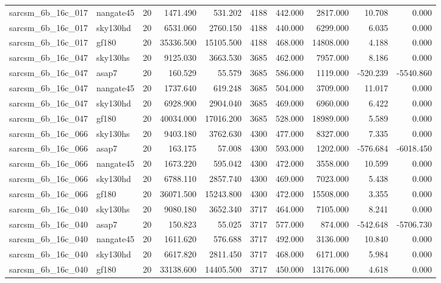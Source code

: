 \begin{tabular}{llrrrrrrrr}
sarcsm\_6b\_16c\_017 & nangate45 & 20 & 1471.490 & 531.202 & 4188 & 442.000 & 2817.000 & 10.708 & 0.000 \\
sarcsm\_6b\_16c\_017 & sky130hd & 20 & 6531.060 & 2760.150 & 4188 & 440.000 & 6299.000 & 6.035 & 0.000 \\
sarcsm\_6b\_16c\_017 & gf180 & 20 & 35336.500 & 15105.500 & 4188 & 468.000 & 14808.000 & 4.188 & 0.000 \\
sarcsm\_6b\_16c\_047 & sky130hs & 20 & 9125.030 & 3663.530 & 3685 & 462.000 & 7957.000 & 8.186 & 0.000 \\
sarcsm\_6b\_16c\_047 & asap7 & 20 & 160.529 & 55.579 & 3685 & 586.000 & 1119.000 & -520.239 & -5540.860 \\
sarcsm\_6b\_16c\_047 & nangate45 & 20 & 1737.640 & 619.248 & 3685 & 504.000 & 3709.000 & 11.017 & 0.000 \\
sarcsm\_6b\_16c\_047 & sky130hd & 20 & 6928.900 & 2904.040 & 3685 & 469.000 & 6960.000 & 6.422 & 0.000 \\
sarcsm\_6b\_16c\_047 & gf180 & 20 & 40034.000 & 17016.200 & 3685 & 528.000 & 18989.000 & 5.589 & 0.000 \\
sarcsm\_6b\_16c\_066 & sky130hs & 20 & 9403.180 & 3762.630 & 4300 & 477.000 & 8327.000 & 7.335 & 0.000 \\
sarcsm\_6b\_16c\_066 & asap7 & 20 & 163.175 & 57.008 & 4300 & 593.000 & 1202.000 & -576.684 & -6018.450 \\
sarcsm\_6b\_16c\_066 & nangate45 & 20 & 1673.220 & 595.042 & 4300 & 472.000 & 3558.000 & 10.599 & 0.000 \\
sarcsm\_6b\_16c\_066 & sky130hd & 20 & 6788.110 & 2857.740 & 4300 & 469.000 & 7023.000 & 5.438 & 0.000 \\
sarcsm\_6b\_16c\_066 & gf180 & 20 & 36071.500 & 15243.800 & 4300 & 472.000 & 15508.000 & 3.355 & 0.000 \\
sarcsm\_6b\_16c\_040 & sky130hs & 20 & 9080.180 & 3652.340 & 3717 & 464.000 & 7105.000 & 8.241 & 0.000 \\
sarcsm\_6b\_16c\_040 & asap7 & 20 & 150.823 & 55.025 & 3717 & 577.000 & 874.000 & -542.648 & -5706.730 \\
sarcsm\_6b\_16c\_040 & nangate45 & 20 & 1611.620 & 576.688 & 3717 & 492.000 & 3136.000 & 10.840 & 0.000 \\
sarcsm\_6b\_16c\_040 & sky130hd & 20 & 6617.820 & 2811.450 & 3717 & 468.000 & 6171.000 & 5.984 & 0.000 \\
sarcsm\_6b\_16c\_040 & gf180 & 20 & 33138.600 & 14405.500 & 3717 & 450.000 & 13176.000 & 4.618 & 0.000 \\

\end{tabular}
